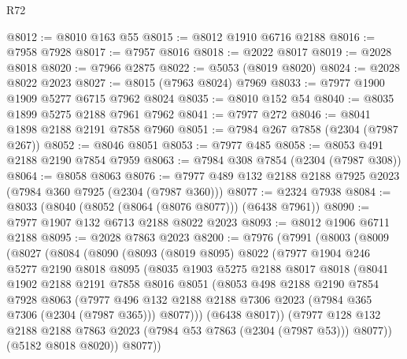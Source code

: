 \begin{lexlean}{R72}
\begin{coremodule}
@8012 := @8010 @163 @55
@8015 := @8012 @1910 @6716 @2188
@8016 := @7958 @7928
@8017 := @7957 @8016
@8018 := @2022 @8017
@8019 := @2028 @8018
@8020 := @7966 @2875
@8022 := @5053 (@8019 @8020)
@8024 := @2028 @8022 @2023
@8027 := @8015 (@7963 @8024) @7969
@8033 := @7977 @1900 @1909 @5277 @6715 @7962 @8024
@8035 := @8010 @152 @54
@8040 := @8035 @1899 @5275 @2188 @7961 @7962
@8041 := @7977 @272
@8046 := @8041 @1898 @2188 @2191 @7858 @7960
@8051 := @7984 @267 @7858 (@2304 (@7987 @267))
@8052 := @8046 @8051
@8053 := @7977 @485
@8058 := @8053 @491 @2188 @2190 @7854 @7959
@8063 := @7984 @308 @7854 (@2304 (@7987 @308))
@8064 := @8058 @8063
@8076 := @7977 @489 @132 @2188 @2188 @7925 @2023 (@7984 @360 @7925 (@2304 (@7987 @360)))
@8077 := @2324 @7938
@8084 := @8033 (@8040 (@8052 (@8064 (@8076 @8077))) (@6438 @7961))
@8090 := @7977 @1907 @132 @6713 @2188 @8022 @2023
@8093 := @8012 @1906 @6711 @2188
@8095 := @2028 @7863 @2023
@8200 := @7976
    (@7991
      (@8003
        (@8009
          (@8027
            (@8084
              (@8090
                (@8093
                  (@8019 @8095)
                  @8022
                  (@7977
                    @1904
                    @246
                    @5277
                    @2190
                    @8018
                    @8095
                    (@8035
                      @1903
                      @5275
                      @2188
                      @8017
                      @8018
                      (@8041
                        @1902
                        @2188
                        @2191
                        @7858
                        @8016
                        @8051
                        (@8053
                          @498
                          @2188
                          @2190
                          @7854
                          @7928
                          @8063
                          (@7977
                            @496
                            @132
                            @2188
                            @2188
                            @7306
                            @2023
                            (@7984 @365 @7306 (@2304 (@7987 @365)))
                            @8077)))
                      (@6438 @8017))
                    (@7977
                      @128
                      @132
                      @2188
                      @2188
                      @7863
                      @2023
                      (@7984 @53 @7863 (@2304 (@7987 @53)))
                      @8077))
                  (@5182 @8018 @8020))
                @8077))

\end{coremodule}
\end{lexlean}
